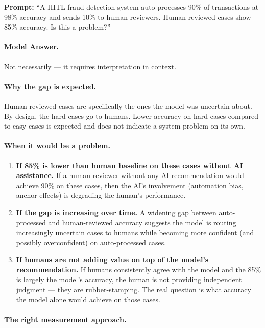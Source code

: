 \textbf{Prompt:} ``A HITL fraud detection system auto-processes 90\% of transactions at 98\% accuracy and sends 10\% to human reviewers. Human-reviewed cases show 85\% accuracy. Is this a problem?''

\paragraph{Model Answer.}

Not necessarily --- it requires interpretation in context.

\paragraph{Why the gap is expected.}

Human-reviewed cases are specifically the ones the model was uncertain about. By design, the hard cases go to humans. Lower accuracy on hard cases compared to easy cases is expected and does not indicate a system problem on its own.

\paragraph{When it would be a problem.}

\begin{enumerate}
    \item \textbf{If 85\% is lower than human baseline on these cases without AI assistance.} If a human reviewer without any AI recommendation would achieve 90\% on these cases, then the AI's involvement (automation bias, anchor effects) is degrading the human's performance.

    \item \textbf{If the gap is increasing over time.} A widening gap between auto-processed and human-reviewed accuracy suggests the model is routing increasingly uncertain cases to humans while becoming more confident (and possibly overconfident) on auto-processed cases.

    \item \textbf{If humans are not adding value on top of the model's recommendation.} If humans consistently agree with the model and the 85\% is largely the model's accuracy, the human is not providing independent judgment --- they are rubber-stamping. The real question is what accuracy the model alone would achieve on those cases.
\end{enumerate}

\paragraph{The right measurement approach.}

